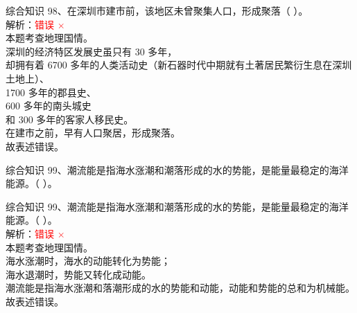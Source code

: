 \documentclass[aspectratio=169]{beamer}
\begin{document}
\begin{frame}[t]{综合知识}
    98、在深圳市建市前，该地区未曾聚集人口，形成聚落（ ）。\\
    解析：\textcolor{red}{错误 $\times$}\\
    本题考查地理国情。\\
    深圳的经济特区发展史虽只有 30 多年，\\
    却拥有着 6700 多年的人类活动史（新石器时代中期就有土著居民繁衍生息在深圳土地上）、\\
    1700 多年的郡县史、\\
    600 多年的南头城史\\
    和 300 多年的客家人移民史。\\
    在建市之前，早有人口聚居，形成聚落。\\
    故表述错误。
\end{frame}                           


\begin{frame}[t]{综合知识}
    99、潮流能是指海水涨潮和潮落形成的水的势能，是能量最稳定的海洋能源。（ ）。
\end{frame}                           
\begin{frame}[t]{综合知识}
    99、潮流能是指海水涨潮和潮落形成的水的势能，是能量最稳定的海洋能源。（ ）。\\
    解析：\textcolor{red}{错误 $\times$}\\
    本题考查地理国情。\\
    海水涨潮时，海水的动能转化为势能；\\
    海水退潮时，势能又转化成动能。\\
    潮流能是指海水涨潮和落潮形成的水的势能和动能，动能和势能的总和为机械能。\\
    故表述错误。\\
\end{frame}                           
\end{document}
